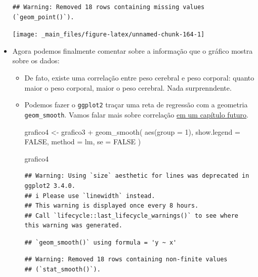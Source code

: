 \documentclass[
  11pt]{report}
\newenvironment{Shaded}{\begin{snugshade}}{\end{snugshade}}
\newcommand{\AttributeTok}[1]{\textcolor[rgb]{0.77,0.63,0.00}{#1}}
\newcommand{\ConstantTok}[1]{\textcolor[rgb]{0.00,0.00,0.00}{#1}}
\newcommand{\DecValTok}[1]{\textcolor[rgb]{0.00,0.00,0.81}{#1}}
\newcommand{\FunctionTok}[1]{\textcolor[rgb]{0.00,0.00,0.00}{#1}}
\newcommand{\NormalTok}[1]{#1}
\newcommand{\OtherTok}[1]{\textcolor[rgb]{0.56,0.35,0.01}{#1}}
\newcommand{\SpecialCharTok}[1]{\textcolor[rgb]{0.00,0.00,0.00}{#1}}
\newcommand{\StringTok}[1]{\textcolor[rgb]{0.31,0.60,0.02}{#1}}
\renewenvironment{Shaded}{
    \begin{mdframed}[%
      roundcorner=2pt,%
      innerleftmargin=5pt,%
      innerrightmargin=5pt,%
      topline=true,%
      leftline=true,%
      rightline=true,%
      bottomline=true,%
      linewidth=0.5pt,%
      linecolor=black!20,%
      backgroundcolor=black!2,%
      skipabove=2ex,%
      skipbelow=2.5ex%
    ]%
  }
  {
    \end{mdframed}
  }
\begin{document}
\begin{itemize}
\begin{verbatim}
## Warning: Removed 18 rows containing missing values (`geom_point()`).
\end{verbatim}

  \begin{center}\texttt{[image: \_main\_files/figure-latex/unnamed-chunk-164-1]} \end{center}
\item
  Agora podemos finalmente comentar sobre a informação que o gráfico mostra sobre os dados:

  \begin{itemize}
  \item
    De fato, existe uma correlação entre peso cerebral e peso corporal: quanto maior o peso corporal, maior o peso cerebral. Nada surprenndente.
  \item
    \protect\hypertarget{grafico4}{}{} Podemos fazer o \texttt{ggplot2} traçar uma reta de regressão com a geometria \texttt{geom\_smooth}. Vamos falar mais sobre correlação \protect\hyperlink{correlacao}{em um capítulo futuro}.

\begin{Shaded}
\begin{Highlighting}[]
\NormalTok{grafico4 }\OtherTok{\textless{}{-}}\NormalTok{ grafico3 }\SpecialCharTok{+}
  \FunctionTok{geom\_smooth}\NormalTok{(}
    \FunctionTok{aes}\NormalTok{(}\AttributeTok{group =} \DecValTok{1}\NormalTok{), }
    \AttributeTok{show.legend =} \ConstantTok{FALSE}\NormalTok{,}
    \AttributeTok{method =} \StringTok{\textquotesingle{}lm\textquotesingle{}}\NormalTok{, }
    \AttributeTok{se =} \ConstantTok{FALSE}
\NormalTok{  )}

\NormalTok{grafico4}
\end{Highlighting}
\end{Shaded}

\begin{verbatim}
## Warning: Using `size` aesthetic for lines was deprecated in ggplot2 3.4.0.
## i Please use `linewidth` instead.
## This warning is displayed once every 8 hours.
## Call `lifecycle::last_lifecycle_warnings()` to see where this warning was generated.
\end{verbatim}

\begin{verbatim}
## `geom_smooth()` using formula = 'y ~ x'
\end{verbatim}

\begin{verbatim}
## Warning: Removed 18 rows containing non-finite values
## (`stat_smooth()`).
\end{verbatim}


\end{itemize}
\end{itemize}
\end{document}

